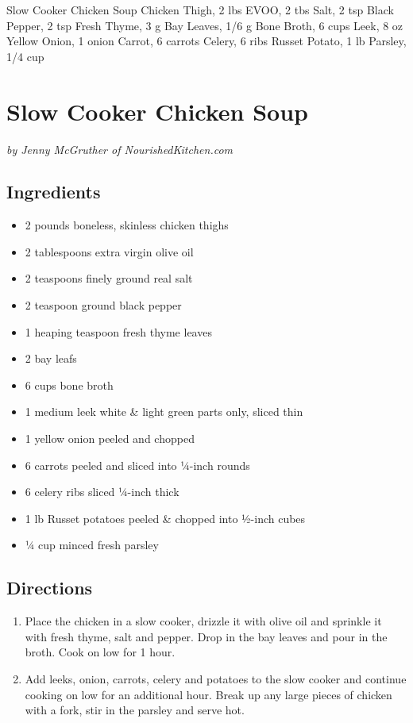 Slow Cooker Chicken Soup
  Chicken Thigh, 2 lbs
  EVOO, 2 tbs
  Salt, 2 tsp
  Black Pepper, 2 tsp
  Fresh Thyme, 3 g
  Bay Leaves, 1/6 g
  Bone Broth, 6 cups
  Leek, 8 oz
  Yellow Onion, 1 onion
  Carrot, 6 carrots
  Celery, 6 ribs
  Russet Potato, 1 lb
  Parsley, 1/4 cup

\section{ Slow Cooker Chicken Soup }
\textit{ by Jenny McGruther of NourishedKitchen.com }

\subsection{ Ingredients }

\begin{itemize}
  \item 2 pounds boneless, skinless chicken thighs
  \item 2 tablespoons extra virgin olive oil 
  \item 2 teaspoons finely ground real salt
  \item 2 teaspoon ground black pepper
  \item 1 heaping teaspoon fresh thyme leaves
  \item 2 bay leafs
  \item 6 cups bone broth 
  \item 1 medium leek white \& light green parts only, sliced thin
  \item 1 yellow onion peeled and chopped
  \item 6 carrots peeled and sliced into ¼-inch rounds
  \item 6 celery ribs sliced ¼-inch thick
  \item 1 lb Russet potatoes peeled \& chopped into ½-inch cubes
  \item ¼ cup minced fresh parsley
\end{itemize}

\subsection{ Directions }

\begin{enumerate}
    \item Place the chicken in a slow cooker, drizzle it with olive oil and sprinkle it with fresh thyme, salt and pepper. Drop in the bay leaves and pour in the broth. Cook on low for 1 hour.
    \item Add leeks, onion, carrots, celery and potatoes to the slow cooker and continue cooking on low for an additional hour. Break up any large pieces of chicken with a fork, stir in the parsley and serve hot.
\end{enumerate}
